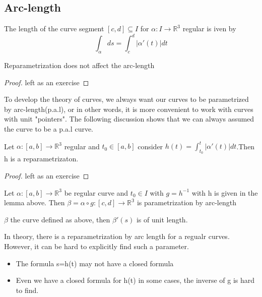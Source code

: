 \documentclass{article}
\begin{document}
\subsection{Arc-length}
\begin{definition}
    The length of the curve segment $[c,d]\subseteq I$ for $\alpha:I\to \mathbb{R}^3  $ regular is iven by \[\int_{\alpha} ds = \int_c^d |\alpha'(t)|dt\]
\end{definition}
\begin{proposition}
    Reparametrization does not affect the arc-length
\end{proposition}
\begin{proof}
    left as an exercise
\end{proof}

To develop the theory of curves, we always want our curves to be parametrized by arc-length(p.a.l), or in other words, it is more convenient to work with curves with unit "pointers". The following discussion shows that we can always assumed the curve to be a p.a.l curve.

\begin{lemma}
    Let $\alpha:[a,b]\to \mathbb{R}^3$ regular and $t_0\in [a,b]$ consider $h(t)=\int_{t_0}^t |\alpha'(t)|dt$.Then h is a reparametrizaton.
\end{lemma}
\begin{proof}
    left as an exercise
\end{proof}

\begin{definition}
Let $\alpha:[a,b]\to \mathbb{R}^3 $ be regular curve and $t_0\in I$ with $g=h^{-1}$ with h is given in the lemma above. Then $\beta=\alpha\circ g :[c,d]\to \mathbb{R^3}$ is parametrization by arc-length    
\end{definition}

\begin{proposition}
    $\beta $ the curve defined as above, then $\beta'(s)$ is of unit length.
\end{proposition}

\begin{remark}
    In theory, there is a reparametrization by arc length for a regualr curves. However, it can be hard to explicitly find such a parameter.
    \begin{itemize}
        \item The formula s=h(t) may not have a closed formula
        \item Even we have a closed formula for h(t) in some cases, the inverse of g is hard to find.
    \end{itemize}
\end{remark}
\end{document}
